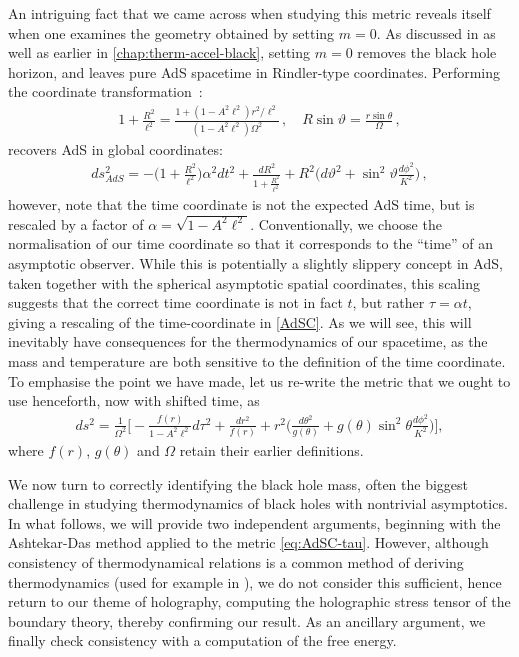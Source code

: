 \documentclass[
twoside,
openright,
frontopenright,
]{dmathesis}
\newcommand{\tcr}{\textcolor{red}}
\begin{document}
An intriguing fact that we came across when studying this metric reveals itself
when one examines the geometry obtained by setting $m=0$. As discussed in
\cite{Appels:2017xoe,Gregory:2017ogk} as well as earlier in
\cref{chap:therm-accel-black}, setting $m=0$ removes the black hole horizon, and
leaves pure AdS spacetime in Rindler-type coordinates.  Performing the
coordinate transformation~\cite{Podolsky:2002nk}:
\begin{align}
1+\frac{R^2}{\ell^2}=\frac{1+(1-A^2\ell^2)r^2/\ell^2}{(1-A^2\ell^2)\Omega^2}\,, \quad
R\sin\vartheta=\frac{r\sin\theta}{\Omega}\,,
\end{align}
recovers AdS in global coordinates:
\begin{align}
\label{gAdS}
 ds^2_{AdS}= -\Big(1+\frac{R^2}{\ell^2}\Big) \alpha^2
dt^2+\frac{dR^2}{1+\frac{R^2}{\ell^2}}  +R^2\Big(d\vartheta^2+\sin^2\vartheta
\frac{d\phi^2}{K^2}\Big)\,,
\end{align}
however, note that the time coordinate is not the expected AdS time, but is
rescaled by a factor of $\alpha = \sqrt{1-A^2 \ell^2}$. Conventionally, we
choose the normalisation of our time coordinate so that it corresponds to the
``time'' of an asymptotic observer. While this is potentially a slightly
slippery concept in AdS, taken together with the spherical asymptotic spatial
coordinates, this scaling suggests that the correct time coordinate is not in
fact $t$, but rather $\tau=\alpha t$, giving a rescaling of the time-coordinate
in \eqref{AdSC}. As we will see, this will inevitably have consequences for the
thermodynamics of our spacetime, as the mass and temperature are both sensitive
to the definition of the time coordinate. To emphasise the point we have made,
let us re-write the metric that we ought to use henceforth, now with shifted
time, as
\begin{align}\label{eq:AdSC-tau}
ds^2=\frac{1}{\Omega^2}\bigg[ -\frac{f(r)}{1-A^2\ell^2}d\tau^2+\frac{dr^2}{f(r)}
+r^2\Big(\frac{d\theta^2}{g(\theta)}
+g(\theta)\sin^2\theta\frac{d\phi^2}{K^2}\Big)\bigg],
\end{align}
where $f(r)$, $g(\theta)$ and $\Omega$ retain their earlier
definitions.

We now turn to correctly identifying the black hole mass, often the biggest
challenge in studying thermodynamics of black holes with nontrivial
asymptotics. In what follows, we will provide two independent
arguments, %
beginning with the Ashtekar-Das method \cite{Ashtekar:1999jx,Das:2000cu} applied
to the metric \eqref{eq:AdSC-tau}. However, although consistency of thermodynamical
relations is a common method of deriving thermodynamics (used for {example in
  \cite{Astorino:2016ybm}}), we do not consider this sufficient, hence return to
our theme of holography, computing the holographic stress tensor of the boundary
theory, thereby confirming our result.  As an ancillary argument, we finally
check consistency with a computation of the free energy.
\end{document}
